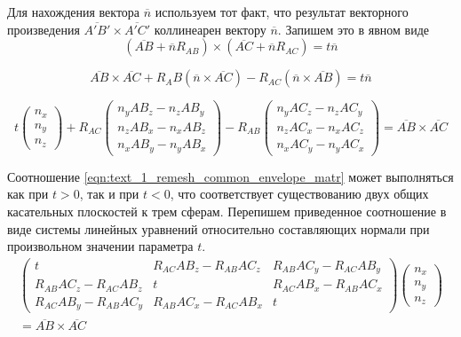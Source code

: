 Для нахождения вектора $\overline{n}$ используем тот факт, что результат векторного произведения $\overline{A'B'} \times \overline{A'C'}$ коллинеарен вектору $\overline{n}$.
Запишем это в явном виде
\begin{equation}
	(\overline{AB} + \overline{n} R_{AB}) \times (\overline{AC} + \overline{n} R_{AC}) = t \overline{n}
\end{equation}

\begin{equation}
	\overline{AB} \times \overline{AC} + R_AB(\overline{n} \times \overline{AC}) - R_{AC}(\overline{n} \times \overline{AB}) = t \overline{n}
\end{equation}

\begin{equation}\label{eqn:text_1_remesh_common_envelope_matr}
	t
	\begin{pmatrix}
		n_x \\
		n_y \\
		n_z
	\end{pmatrix}
	+ R_{AC}
	\begin{pmatrix}
		n_y AB_z - n_z AB_y \\
		n_z AB_x - n_x AB_z \\
		n_x AB_y - n_y AB_x
	\end{pmatrix}
	- R_{AB}
	\begin{pmatrix}
		n_y AC_z - n_z AC_y \\
		n_z AC_x - n_x AC_z \\
		n_x AC_y - n_y AC_x
	\end{pmatrix}
	= \overline{AB} \times \overline{AC}
\end{equation}

Соотношение \eqref{eqn:text_1_remesh_common_envelope_matr} может выполняться как при $t > 0$, так и при $t < 0$, что соответствует существованию двух общих касательных плоскостей к трем сферам.
Перепишем приведенное соотношение в виде системы линейных уравнений относительно составляющих нормали при произвольном значении параметра $t$.
\begin{multline}\label{eqn:text_1_remesh_common_envelope_matr2}
	\begin{pmatrix}
		t                         & R_{AC} AB_z - R_{AB} AC_z & R_{AB} AC_y - R_{AC} AB_y \\
		R_{AB} AC_z - R_{AC} AB_z & t                         & R_{AC} AB_x - R_{AB} AC_x \\
		R_{AC} AB_y - R_{AB} AC_y & R_{AB} AC_x - R_{AC} AB_x & t
	\end{pmatrix}
	\begin{pmatrix}
		n_x \\
		n_y \\
		n_z
	\end{pmatrix} \\
	= \overline{AB} \times \overline{AC}
\end{multline}

